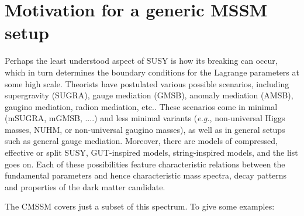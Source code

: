 \section{Motivation for a generic MSSM setup}
\label{sec:motivation}

Perhaps the least understood aspect of SUSY is how its breaking can occur, 
which in turn determines the boundary conditions for the Lagrange 
parameters at some high scale. Theorists have postulated various 
possible scenarios, including 
supergravity (SUGRA), 
gauge mediation (GMSB), 
anomaly mediation (AMSB), 
gaugino mediation, radion mediation, etc.. 
These scenarios come in minimal (mSUGRA, mGMSB, ....) and  
less minimal variants ({\it e.g.}, non-universal Higgs masses, NUHM,  
or non-universal gaugino masses), as well as in general setups
such as  general gauge mediation. 
Moreover, there are models of compressed, effective or split SUSY, 
GUT-inspired models, string-inspired models, and the list goes on. 
Each of these possibilities feature characteristic relations between the
fundamental parameters and hence characteristic mass spectra, decay 
patterns and properties of the dark matter candidate. 

The CMSSM covers just a subset of this spectrum. To give some 
examples:

